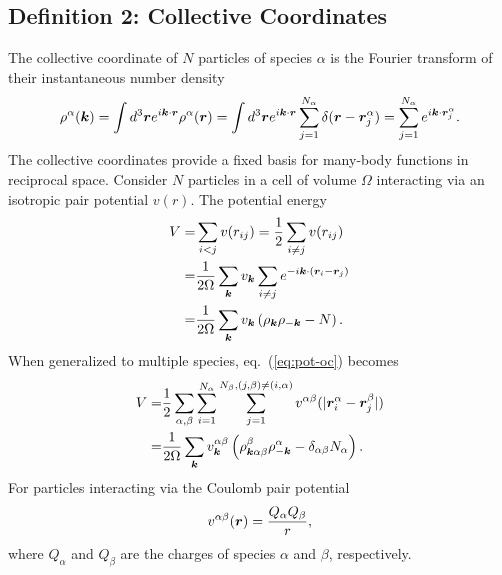 \subsection{Definition 2: Collective Coordinates}
The collective coordinate of $N$ particles of species $\alpha$ is the Fourier transform of their instantaneous number density
\begin{align}
\rho^\alpha(\boldsymbol{k}) = \int d^3\boldsymbol{r} e^{i\boldsymbol{k}\cdot\boldsymbol{r}} \rho^\alpha(\boldsymbol{r})
= \int d^3\boldsymbol{r} e^{i\boldsymbol{k}\cdot\boldsymbol{r}} \sum\limits_{j=1}^{N_\alpha} \delta(\boldsymbol{r}-\boldsymbol{r}^\alpha_j)=\sum\limits_{j=1}^{N_\alpha} e^{i\boldsymbol{k}\cdot\boldsymbol{r}_j^\alpha}. \label{eq:rhok}
\end{align}
The collective coordinates provide a fixed basis for many-body functions in reciprocal space. Consider $N$ particles in a cell of volume $\Omega$ interacting via an isotropic pair potential $v(r)$. The potential energy
\begin{align}
V =& \sum\limits_{i<j} v(r_{ij}) = \frac{1}{2} \sum\limits_{i\neq j} v(r_{ij}) \nonumber \\
=& \frac{1}{2\Omega} \sum\limits_{\boldsymbol{k}}v_{\boldsymbol{k}} \sum\limits_{i\neq j}   e^{-i\boldsymbol{k}\cdot(\boldsymbol{r}_i-\boldsymbol{r}_j)} \nonumber \\
=& \frac{1}{2\Omega} \sum\limits_{\boldsymbol{k}}v_{\boldsymbol{k}} \left( \rho_{\boldsymbol{k}}\rho_{-\boldsymbol{k}}-N \right). \label{eq:pot-oc}
\end{align}
When generalized to multiple species, eq.~(\ref{eq:pot-oc}) becomes
\begin{align}
V =& \frac{1}{2}\sum\limits_{\alpha, \beta} \sum\limits_{i=1}^{N_\alpha} \sum\limits_{j=1}^{N_\beta, (j,\beta)\neq(i,\alpha)} v^{\alpha\beta}(\vert\boldsymbol{r}_i^\alpha - \boldsymbol{r}_j^\beta \vert) \nonumber \\
=& \frac{1}{2\Omega} \sum\limits_{\boldsymbol{k}}
v^{\alpha\beta}_{\boldsymbol{k}} \left( \rho^\beta_{\boldsymbol{k}\alpha\beta}\rho^\alpha_{-\boldsymbol{k}}-\delta_{\alpha\beta}N_\alpha \right). \label{eq:pot-mc}
\end{align}
For particles interacting via the Coulomb pair potential
\begin{align}
v^{\alpha\beta}(\boldsymbol{r}) = \frac{Q_\alpha Q_\beta}{r},
\end{align}
where $Q_\alpha$ and $Q_\beta$ are the charges of species $\alpha$ and $\beta$, respectively.

